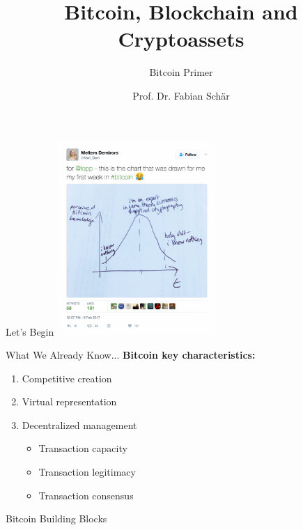 \documentclass[handout]{beamer}
\title{Bitcoin, Blockchain and Cryptoassets}
\subtitle{Bitcoin Primer}
\author{Prof. Dr. Fabian Schär}
\institute{University of Basel}
\begin{document}
\thispagestyle{empty}
\begin{frame}[noframenumbering]
	\titlepage
\end{frame}

\begin{frame}{Let's Begin}
	\center
	\includegraphics[width=6cm]{../assets/images/meltem_tweet}
\end{frame}

\begin{frame}{What We Already Know...}
\textbf{Bitcoin key characteristics:}
	\begin{enumerate}
		\item Competitive creation
		\item Virtual representation
		\item Decentralized management
		\begin{itemize}
			\item Transaction capacity
			\item Transaction legitimacy
			\item Transaction consensus
		\end{itemize}
	\end{enumerate}
	\vspace{1em}
\end{frame}

\begin{frame}{Bitcoin Building Blocks}
	\begin{figure}[h!]
		\center
		
		\label{fig:bitcoinsystem}
	\end{figure}
\end{frame}
\end{document}

